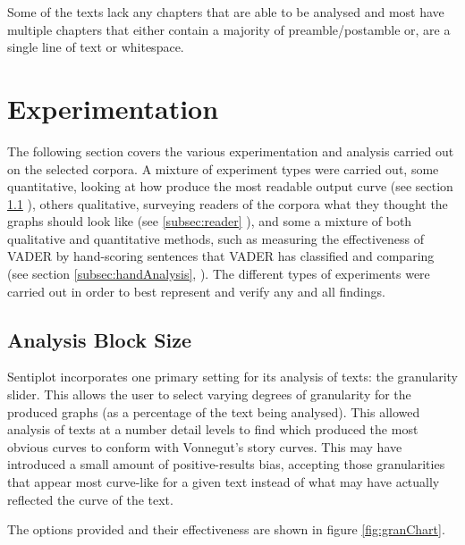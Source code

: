 \documentclass{article}
\begin{document}
{            Some of the texts lack any chapters that are able to be analysed and most have multiple chapters that either contain a majority of preamble/postamble or, are a single line of text or whitespace.
\newpage
\section{Experimentation}
\label{sec:experiments}
The following section covers the various experimentation and analysis carried out on the selected corpora. A mixture of experiment types were carried out, some quantitative, looking at how produce the most readable output curve (see section \ref{subsec:blockSize} ), others qualitative, surveying readers of the corpora what they thought the graphs should look like (see \ref{subsec:reader} ), and some a mixture of both qualitative and quantitative methods, such as measuring the effectiveness of VADER by hand-scoring sentences that VADER has classified and comparing (see section \ref{subsec:handAnalysis}, ). The different types of experiments were carried out in order to best represent and verify any and all findings.

    \subsection{Analysis Block Size}
    \label{subsec:blockSize}
        Sentiplot incorporates one primary setting for its analysis of texts: the granularity slider. This allows the user to select varying degrees of granularity for the produced graphs (as a percentage of the text being analysed). This allowed analysis of texts at a number detail levels to find which produced the most obvious curves to conform with Vonnegut's story curves. This may have introduced a small amount of positive-results bias, accepting those granularities that appear most curve-like for a given text instead of what may have actually reflected the curve of the text.

        The options provided and their effectiveness are shown in figure \ref{fig:granChart}.
        
}
\end{document}
